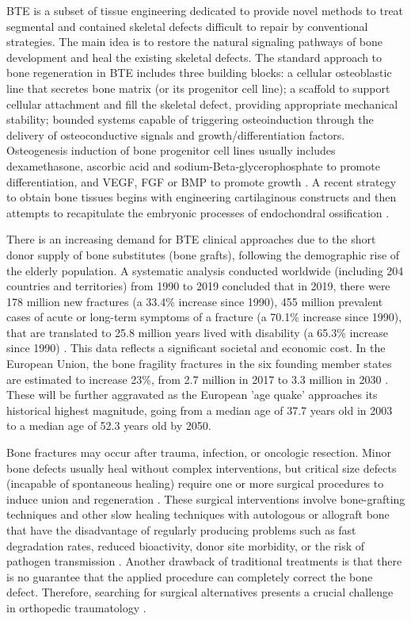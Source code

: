 \ac{BTE} is a subset of tissue engineering dedicated to provide novel methods to treat segmental and contained skeletal defects difficult to repair by conventional strategies. The main idea is to restore the natural signaling pathways of bone development and heal the existing skeletal defects. The standard approach to bone regeneration in \ac{BTE} includes three building blocks: a cellular osteoblastic line that secretes bone matrix (or its progenitor cell line); a scaffold to support cellular attachment and fill the skeletal defect, providing appropriate mechanical stability; bounded systems capable of triggering osteoinduction through the delivery of osteoconductive signals and growth/differentiation factors. Osteogenesis induction of bone progenitor cell lines usually includes dexamethasone, ascorbic acid and sodium-Beta-glycerophosphate to promote differentiation, and \ac{VEGF}, \ac{FGF} or \ac{BMP} to promote growth \cite{Francois2019-ip, Miron2012-vk, Franz-Odendaal2006-eu}. A recent strategy to obtain bone tissues begins with engineering cartilaginous constructs and then attempts to recapitulate the embryonic processes of endochondral ossification \cite{Fu2021-us}.

There is an increasing demand for \ac{BTE} clinical approaches due to the short donor supply of bone substitutes (bone grafts), following the demographic rise of the elderly population. A systematic analysis conducted worldwide (including 204 countries and territories) from 1990 to 2019 concluded that in 2019, there were 178 million new fractures (a 33.4\% increase since 1990), 455 million prevalent cases of acute or long-term symptoms of a fracture (a 70.1\% increase since 1990), that are translated to 25.8 million years lived with disability (a 65.3\% increase since 1990) \cite{Cauley2021-vt}. This data reflects a significant societal and economic cost. In the European Union, the bone fragility fractures in the six founding member states are estimated to increase 23\%, from 2.7 million in 2017 to 3.3 million in 2030 \cite{Borgstrom2020-ki}. These will be further aggravated as the European 'age quake' approaches its historical highest magnitude, going from a median age of 37.7 years old in 2003 to a median age of 52.3 years old by 2050.

Bone fractures may occur after trauma, infection, or oncologic resection. Minor bone defects usually heal without complex interventions, but critical size defects (incapable of spontaneous healing) require one or more surgical procedures to induce union and regeneration \cite{Gordeladze2017-gs}. These surgical interventions involve bone-grafting techniques and other slow healing techniques with autologous or allograft bone that have the disadvantage of regularly producing problems such as fast degradation rates, reduced bioactivity, donor site morbidity, or the risk of pathogen transmission \cite{Peric_Kacarevic2020-hp}. Another drawback of traditional treatments is that there is no guarantee that the applied procedure can completely correct the bone defect. Therefore, searching for surgical alternatives presents a crucial challenge in orthopedic traumatology \cite{Guerado2017-un}.

